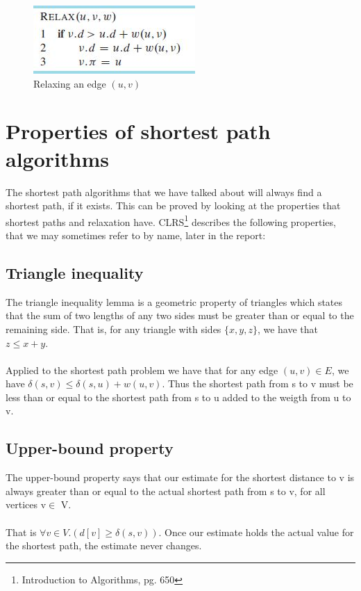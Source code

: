 \documentclass[11pt]{article}
\begin{document}
\begin{figure}[H]
\centering
\includegraphics[scale=0.4]{relaxation.png}
\caption{Relaxing an edge $(u,v)$}
\end{figure}


\section{Properties of shortest path algorithms}
The shortest path algorithms that we have talked about will always find a shortest path, if it exists. This can be proved by looking at the properties that shortest paths and relaxation have. CLRS\footnote{Introduction to Algorithms, pg. 650} describes the following properties, that we may sometimes refer to by name, later in the report:

\subsection{Triangle inequality}
The triangle inequality lemma is a geometric property of triangles which states that the sum of two lengths of any two sides must be greater than or equal to the remaining side. That is, for any triangle with sides $\{x,y,z\}$, we have that $z \leq x+y$.\\\\
Applied to the shortest path problem we have that for any edge $(u,v) \in E$, we have $\delta(s,v)\leq \delta(s,u) + w(u,v)$. Thus the shortest path from s to v must be less than or equal to the shortest path from s to u added to the weigth from u to v.\\
\subsection{Upper-bound property}
The upper-bound property says that our estimate for the shortest distance to v is always greater than or equal to the actual shortest path from s to v, for all vertices v$\in$ V.\\\\
That is $\forall v \in V.(d[v]\geq \delta(s,v))$. Once our estimate holds the actual value for the shortest path, the estimate never changes.\\
\end{document}
